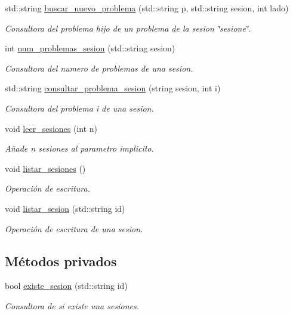 \begin{DoxyCompactItemize}
std\+::string \mbox{\hyperlink{class_cjt__sesion_a4aef15fb48b0465b864eaebeb3808cd0}{buscar\+\_\+nuevo\+\_\+problema}} (std\+::string p, std\+::string sesion, int lado)
\begin{DoxyCompactList}\small\item\em Consultora del problema hijo de un problema de la sesion \char`\"{}sesione\char`\"{}. \end{DoxyCompactList}\item 
int \mbox{\hyperlink{class_cjt__sesion_ac761936095af984ee9a39fdcdf25219c}{num\+\_\+problemas\+\_\+sesion}} (std\+::string sesion)
\begin{DoxyCompactList}\small\item\em Consultora del numero de problemas de una sesion. \end{DoxyCompactList}\item 
std\+::string \mbox{\hyperlink{class_cjt__sesion_a7bc8395d0f4702cd383b11efab65feb1}{consultar\+\_\+problema\+\_\+sesion}} (string sesion, int i)
\begin{DoxyCompactList}\small\item\em Consultora del problema i de una sesion. \end{DoxyCompactList}\item 
void \mbox{\hyperlink{class_cjt__sesion_ad64b0e5339bd3a04de4fba88d6eb98c7}{leer\+\_\+sesiones}} (int n)
\begin{DoxyCompactList}\small\item\em Añade n sesiones al parametro implicito. \end{DoxyCompactList}\item 
void \mbox{\hyperlink{class_cjt__sesion_ab16589173601c81f80305cd9a49b2f7b}{listar\+\_\+sesiones}} ()
\begin{DoxyCompactList}\small\item\em Operación de escritura. \end{DoxyCompactList}\item 
void \mbox{\hyperlink{class_cjt__sesion_a8d8d2ba30c0efeb90e21a9b41fa2c62e}{listar\+\_\+sesion}} (std\+::string id)
\begin{DoxyCompactList}\small\item\em Operación de escritura de una sesion. \end{DoxyCompactList}\end{DoxyCompactItemize}
\subsection*{Métodos privados}
\begin{DoxyCompactItemize}
\item 
bool \mbox{\hyperlink{class_cjt__sesion_a405ed3806e378d1a415588e640584bbd}{existe\+\_\+sesion}} (std\+::string id)
\begin{DoxyCompactList}\small\item\em Consultora de si existe una sesiones. \end{DoxyCompactList}\end{DoxyCompactItemize}
